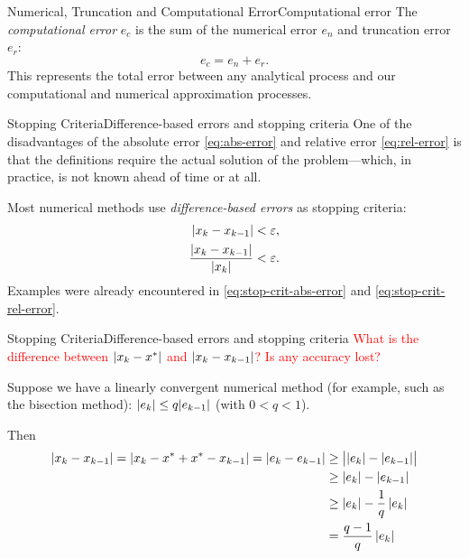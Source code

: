 \documentclass[12pt,aspectratio=169,envcountset]{beamer}
\DeclarePairedDelimiter{\abs}{\lvert}{\rvert}
\begin{document}
\begin{frame}{Numerical, Truncation and Computational Error}{Computational error}
  \label{fr:comp-error}
  The \emph{computational error} $e_c$ is the sum of the numerical error $e_n$
  and truncation error $e_r$:
  \[
    e_c = e_n + e_r.
  \]
  This represents the total error between any analytical process and our
  computational and numerical approximation processes.
\end{frame}

\begin{frame}{Stopping Criteria}{Difference-based errors and stopping criteria}
  One of the disadvantages of the absolute error \eqref{eq:abs-error} and
  relative error \eqref{eq:rel-error} is that the definitions require the actual
  solution of the problem---which, in practice, is not known ahead of time or at
  all.

  Most numerical methods use \emph{difference-based errors} as stopping
  criteria:
  \begin{align}
    \abs{x_k - x_{k-1}} &< \varepsilon, \label{eq:diff-error-abs}\\
    \frac{\abs{x_k - x_{k-1}}}{\abs{x_k}} &< \varepsilon. 
    \label{eq:diff-error-rel}
  \end{align}
  Examples were already encountered in \eqref{eq:stop-crit-abs-error} and
  \eqref{eq:stop-crit-rel-error}.
\end{frame}

\begin{frame}{Stopping Criteria}{Difference-based errors and stopping criteria}
  \textcolor{red}{What is the difference between $\abs{x_k - x^*}$ and $\abs{x_k
  - x_{k-1}}$? Is any accuracy lost?}

  Suppose we have a linearly convergent numerical method (for example, such as
  the bisection method): $\abs{e_k} \leq q\abs{e_{k-1}}$ (with $0 < q < 1$).
  
  Then
  \begin{align*}
    \abs{x_k - x_{k-1}} = \abs{x_k - x^* + x^* - x_{k-1}}
    = \abs{e_k - e_{k-1}} 
    &\geq \bigl\lvert{\abs{e_k} - \abs{e_{k-1}}}\bigr\rvert \\
    &\geq \abs{e_k} - \abs{e_{k-1}} \\
    &\geq \abs{e_k} - \frac{1}{q}\,\abs{e_k} \\
    &= \frac{q - 1}{q}\,\abs{e_k}
  \end{align*}
\end{frame}
\end{document}
